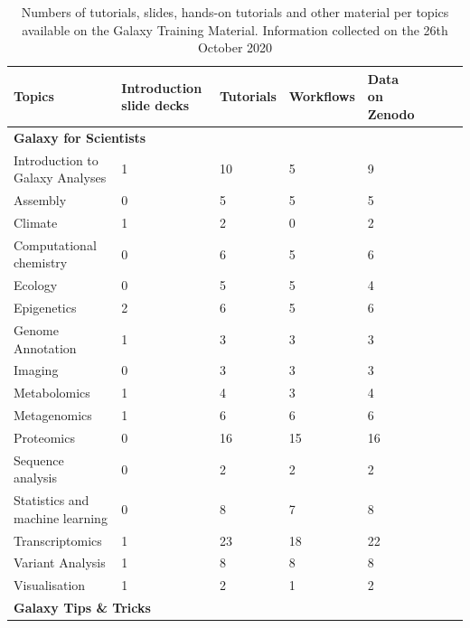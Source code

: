 \documentclass[10pt,letterpaper]{article}
\begin{document}
\begin{table}[]
\begin{adjustwidth}{-2.25in}{0in} %
	\centering
	\caption{Numbers of tutorials, slides, hands-on tutorials and other material per topics available on the Galaxy Training Material. Information collected on the 26th October 2020 \label{tbl:numberOfMaterials}}
	\begin{tabular}{p{2in}|p{0.8in}llp{0.8in}lll}
		\textbf{Topics} & \textbf{Introduction slide decks} & \textbf{Tutorials} & \textbf{Workflows} & \textbf{Data on Zenodo} \\
		\hline
		\multicolumn{5}{l}{\textbf{Galaxy for Scientists}}\\
		\hline
		Introduction to Galaxy Analyses 	            & 1 	& 10 	& 5 	& 9\\
		Assembly    	                                & 0 	& 5 	& 5 	& 5\\
		Climate 	                                    & 1 	& 2 	& 0 	& 2\\
		Computational chemistry 	                    & 0 	& 6 	& 5 	& 6\\
		Ecology 	                                    & 0 	& 5 	& 5 	& 4\\
		Epigenetics 	                                & 2 	& 6 	& 5 	& 6\\
		Genome Annotation 	                            & 1 	& 3 	& 3 	& 3\\
		Imaging 	                                    & 0 	& 3 	& 3 	& 3\\
		Metabolomics 	                                & 1 	& 4 	& 3 	& 4\\
		Metagenomics 	                                & 1 	& 6 	& 6 	& 6\\
		Proteomics 	                                    & 0 	& 16 	& 15 	& 16\\
		Sequence analysis 	                            & 0 	& 2 	& 2 	& 2\\
		Statistics and machine learning 	            & 0 	& 8 	& 7 	& 8\\
		Transcriptomics 	                            & 1 	& 23 	& 18 	& 22\\
		Variant Analysis 	                            & 1 	& 8 	& 8 	& 8\\
		Visualisation 	                                & 1 	& 2 	& 1 	& 2\\
		\hline
		\multicolumn{5}{l}{\textbf{Galaxy Tips \& Tricks}}\\

\end{tabular}
\end{adjustwidth}
\end{table}
\end{document}
